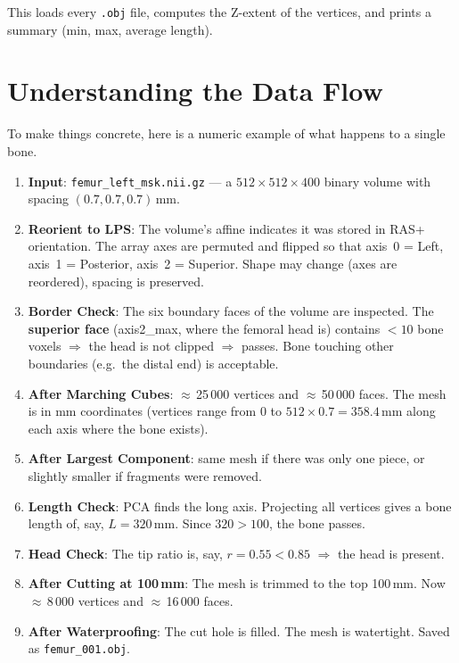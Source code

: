 \documentclass[12pt,a4paper]{article}
\begin{document}
This loads every \texttt{.obj} file, computes the Z-extent of the vertices,
and prints a summary (min, max, average length).


\section{Understanding the Data Flow}

To make things concrete, here is a numeric example of what happens to a single
bone.

\begin{enumerate}
    \item \textbf{Input}: \texttt{femur\_left\_msk.nii.gz}
          — a $512 \times 512 \times 400$ binary volume with spacing
          $(0.7, 0.7, 0.7)$\,mm.

    \item \textbf{Reorient to LPS}: The volume's affine indicates it was stored
          in RAS+ orientation.  The array axes are permuted and flipped so that
          axis~0 = Left, axis~1 = Posterior, axis~2 = Superior.  Shape may
          change (axes are reordered), spacing is preserved.

    \item \textbf{Border Check}: The six boundary faces of the volume are
          inspected.  The \textbf{superior face} (axis2\_max, where the
          femoral head is) contains $< 10$ bone voxels $\Rightarrow$
          the head is not clipped $\Rightarrow$ passes.  Bone touching
          other boundaries (e.g.\ the distal end) is acceptable.

    \item \textbf{After Marching Cubes}: $\approx$\,25\,000 vertices and
          $\approx$\,50\,000 faces.  The mesh is in mm coordinates (vertices
          range from $0$ to $512 \times 0.7 = 358.4$\,mm along each axis
          where the bone exists).

    \item \textbf{After Largest Component}: same mesh if there was only one
          piece, or slightly smaller if fragments were removed.

    \item \textbf{Length Check}: PCA finds the long axis.  Projecting all
          vertices gives a bone length of, say, $L = 320$\,mm.
          Since $320 > 100$, the bone passes.

    \item \textbf{Head Check}: The tip ratio is, say, $r = 0.55 < 0.85$
          $\Rightarrow$ the head is present.

    \item \textbf{After Cutting at 100\,mm}: The mesh is trimmed to the top
          100\,mm.  Now $\approx$\,8\,000 vertices and $\approx$\,16\,000 faces.

    \item \textbf{After Waterproofing}: The cut hole is filled.  The mesh is
          watertight.  Saved as \texttt{femur\_001.obj}.
\end{enumerate}
\end{document}
